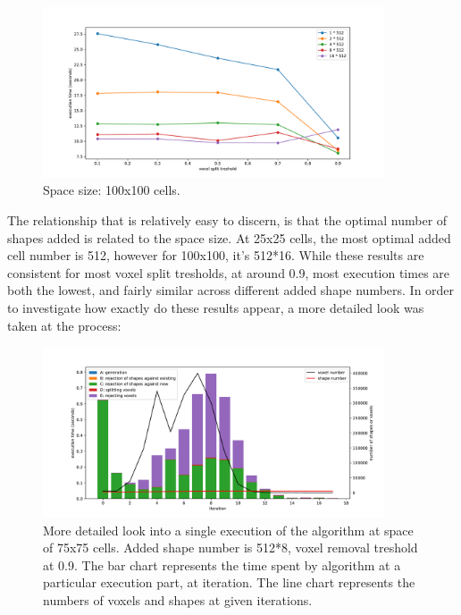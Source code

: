 \documentclass[12pt, oneside]{report}
\begin{document}
\begin{figure}[H]
  \centering
	\label{summary_res100}
	\includegraphics[width=0.9\textwidth,keepaspectratio]{Images/SummaryOptimisation/results_100.pdf}
	\caption{Space size: 100x100 cells.}
\end{figure}

The relationship that is relatively easy to discern, is that the optimal number of shapes added is related to the space size. At 25x25 cells, the most optimal added cell number is 512, however for 100x100, it's 512*16. While these results are consistent for most voxel split tresholds, at around 0.9, most execution times are both the lowest, and fairly similar across different added shape numbers. In order to investigate how exactly do these results appear, a more detailed look was taken at the process:

\begin{figure}[H]
  \centering
	\label{summary_detail_75_512x8_09}
	\includegraphics[width=0.9\textwidth,keepaspectratio]{Images/SummaryOptimisation/iter_75_512x8_09.pdf}
	\caption{More detailed look into a single execution of the algorithm at space of 75x75 cells. Added shape number is 512*8, voxel removal treshold at 0.9. The bar chart represents the time spent by algorithm at a particular execution part, at iteration. The line chart represents the numbers of voxels and shapes at given iterations.}
\end{figure}
\end{document}
